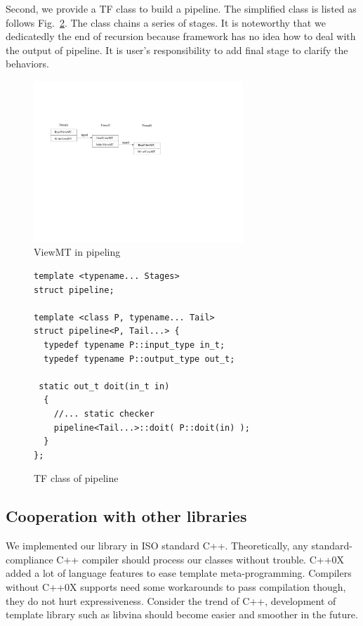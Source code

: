 \documentclass[10pt, conference, compsocconf]{IEEEtran}
\begin{document}
Second, we provide a TF class to
build a pipeline. The simplified class is listed as follows
Fig.~\ref{lst:pipe}. The class chains a series of stages. It is noteworthy
that we dedicatedly the end of recursion because framework has no idea
how to deal with the output of pipeline. It is user's responsibility
to add final stage to clarify the behaviors. 
\begin{figure}[htp]
\includegraphics[width=3.1in]{viewmt}
\caption{ViewMT in pipeling}\label{fig:viewmt}
\end{figure}

\begin{figure}[!htp]
\begin{minipage}[tb]{\linewidth}
\makebox[\textwidth]{\hrulefill}
\begin{small}
\begin{verbatim}
template <typename... Stages>
struct pipeline;

template <class P, typename... Tail>
struct pipeline<P, Tail...> {
  typedef typename P::input_type in_t;
  typedef typename P::output_type out_t;
 
 static out_t doit(in_t in)
  {
    //... static checker
    pipeline<Tail...>::doit( P::doit(in) );
  }
};  
\end{verbatim}
\end{small}
\vspace{-1ex}\makebox[\textwidth]{\hrulefill}
\end{minipage}
\caption{TF class of pipeline}\label{lst:pipe}
\end{figure}

\subsection{Cooperation with other libraries}
We implemented our library in ISO standard
C++\cite{b8}. Theoretically, any standard-compliance C++ compiler
should process our classes without trouble. C++0X \cite{b17} added a
lot of language features to ease template meta-programming. Compilers
without C++0X supports need some workarounds to pass compilation
though, they do not hurt expressiveness. Consider the trend of C++, development of template library such as libvina should become easier and smoother in the future. 
\end{document}
